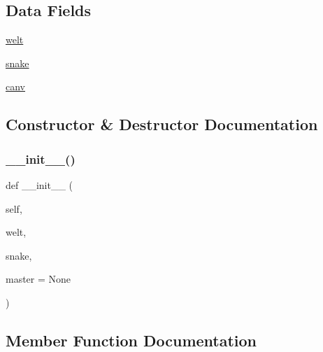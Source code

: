 \subsection*{Data Fields}
\begin{DoxyCompactItemize}
\item 
\mbox{\hyperlink{class_projekt_01_snake_01auf_01_python_1_1_snake__spiel_a80417409ca56d97eabc593c02dbb4a1c}{welt}}
\item 
\mbox{\hyperlink{class_projekt_01_snake_01auf_01_python_1_1_snake__spiel_aa798779259654cac04213978cf4297ab}{snake}}
\item 
\mbox{\hyperlink{class_projekt_01_snake_01auf_01_python_1_1_snake__spiel_a9a3afecebf45ad60fdcaa433890500d8}{canv}}
\end{DoxyCompactItemize}


\subsection{Constructor \& Destructor Documentation}
\mbox{\label{class_projekt_01_snake_01auf_01_python_1_1_snake__spiel_a274359678421f70fd2478eaf545418c9}} 
\subsubsection{\texorpdfstring{\+\_\+\+\_\+init\+\_\+\+\_\+()}{\_\_init\_\_()}}
{\footnotesize\ttfamily def \+\_\+\+\_\+init\+\_\+\+\_\+ (\begin{DoxyParamCaption}\item[{}]{self,  }\item[{}]{welt,  }\item[{}]{snake,  }\item[{}]{master = {\ttfamily None} }\end{DoxyParamCaption})}



\subsection{Member Function Documentation}
\mbox{\label{class_projekt_01_snake_01auf_01_python_1_1_snake__spiel_a76c6e965ba7b947b9cd58531eb5ff7bf}} 
